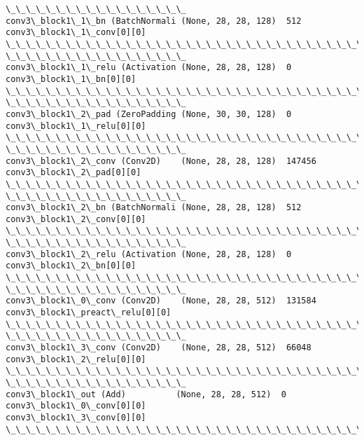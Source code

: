 \documentclass[11pt]{article}
\begin{document}
\begin{Verbatim}[commandchars=\\\{\}]
\_\_\_\_\_\_\_\_\_\_\_\_\_\_\_\_\_\_
conv3\_block1\_1\_bn (BatchNormali (None, 28, 28, 128)  512
conv3\_block1\_1\_conv[0][0]
\_\_\_\_\_\_\_\_\_\_\_\_\_\_\_\_\_\_\_\_\_\_\_\_\_\_\_\_\_\_\_\_\_\_\_\_\_\_\_\_\_\_\_\_\_\_\_\_\_\_\_\_\_\_\_\_\_\_\_\_\_\_\_\_\_\_\_\_\_\_\_\_\_\_\_\_\_\_\_\_
\_\_\_\_\_\_\_\_\_\_\_\_\_\_\_\_\_\_
conv3\_block1\_1\_relu (Activation (None, 28, 28, 128)  0
conv3\_block1\_1\_bn[0][0]
\_\_\_\_\_\_\_\_\_\_\_\_\_\_\_\_\_\_\_\_\_\_\_\_\_\_\_\_\_\_\_\_\_\_\_\_\_\_\_\_\_\_\_\_\_\_\_\_\_\_\_\_\_\_\_\_\_\_\_\_\_\_\_\_\_\_\_\_\_\_\_\_\_\_\_\_\_\_\_\_
\_\_\_\_\_\_\_\_\_\_\_\_\_\_\_\_\_\_
conv3\_block1\_2\_pad (ZeroPadding (None, 30, 30, 128)  0
conv3\_block1\_1\_relu[0][0]
\_\_\_\_\_\_\_\_\_\_\_\_\_\_\_\_\_\_\_\_\_\_\_\_\_\_\_\_\_\_\_\_\_\_\_\_\_\_\_\_\_\_\_\_\_\_\_\_\_\_\_\_\_\_\_\_\_\_\_\_\_\_\_\_\_\_\_\_\_\_\_\_\_\_\_\_\_\_\_\_
\_\_\_\_\_\_\_\_\_\_\_\_\_\_\_\_\_\_
conv3\_block1\_2\_conv (Conv2D)    (None, 28, 28, 128)  147456
conv3\_block1\_2\_pad[0][0]
\_\_\_\_\_\_\_\_\_\_\_\_\_\_\_\_\_\_\_\_\_\_\_\_\_\_\_\_\_\_\_\_\_\_\_\_\_\_\_\_\_\_\_\_\_\_\_\_\_\_\_\_\_\_\_\_\_\_\_\_\_\_\_\_\_\_\_\_\_\_\_\_\_\_\_\_\_\_\_\_
\_\_\_\_\_\_\_\_\_\_\_\_\_\_\_\_\_\_
conv3\_block1\_2\_bn (BatchNormali (None, 28, 28, 128)  512
conv3\_block1\_2\_conv[0][0]
\_\_\_\_\_\_\_\_\_\_\_\_\_\_\_\_\_\_\_\_\_\_\_\_\_\_\_\_\_\_\_\_\_\_\_\_\_\_\_\_\_\_\_\_\_\_\_\_\_\_\_\_\_\_\_\_\_\_\_\_\_\_\_\_\_\_\_\_\_\_\_\_\_\_\_\_\_\_\_\_
\_\_\_\_\_\_\_\_\_\_\_\_\_\_\_\_\_\_
conv3\_block1\_2\_relu (Activation (None, 28, 28, 128)  0
conv3\_block1\_2\_bn[0][0]
\_\_\_\_\_\_\_\_\_\_\_\_\_\_\_\_\_\_\_\_\_\_\_\_\_\_\_\_\_\_\_\_\_\_\_\_\_\_\_\_\_\_\_\_\_\_\_\_\_\_\_\_\_\_\_\_\_\_\_\_\_\_\_\_\_\_\_\_\_\_\_\_\_\_\_\_\_\_\_\_
\_\_\_\_\_\_\_\_\_\_\_\_\_\_\_\_\_\_
conv3\_block1\_0\_conv (Conv2D)    (None, 28, 28, 512)  131584
conv3\_block1\_preact\_relu[0][0]
\_\_\_\_\_\_\_\_\_\_\_\_\_\_\_\_\_\_\_\_\_\_\_\_\_\_\_\_\_\_\_\_\_\_\_\_\_\_\_\_\_\_\_\_\_\_\_\_\_\_\_\_\_\_\_\_\_\_\_\_\_\_\_\_\_\_\_\_\_\_\_\_\_\_\_\_\_\_\_\_
\_\_\_\_\_\_\_\_\_\_\_\_\_\_\_\_\_\_
conv3\_block1\_3\_conv (Conv2D)    (None, 28, 28, 512)  66048
conv3\_block1\_2\_relu[0][0]
\_\_\_\_\_\_\_\_\_\_\_\_\_\_\_\_\_\_\_\_\_\_\_\_\_\_\_\_\_\_\_\_\_\_\_\_\_\_\_\_\_\_\_\_\_\_\_\_\_\_\_\_\_\_\_\_\_\_\_\_\_\_\_\_\_\_\_\_\_\_\_\_\_\_\_\_\_\_\_\_
\_\_\_\_\_\_\_\_\_\_\_\_\_\_\_\_\_\_
conv3\_block1\_out (Add)          (None, 28, 28, 512)  0
conv3\_block1\_0\_conv[0][0]
conv3\_block1\_3\_conv[0][0]
\_\_\_\_\_\_\_\_\_\_\_\_\_\_\_\_\_\_\_\_\_\_\_\_\_\_\_\_\_\_\_\_\_\_\_\_\_\_\_\_\_\_\_\_\_\_\_\_\_\_\_\_\_\_\_\_\_\_\_\_\_\_\_\_\_\_\_\_\_\_\_\_\_\_\_\_\_\_\_\_

\end{Verbatim}
\end{document}

